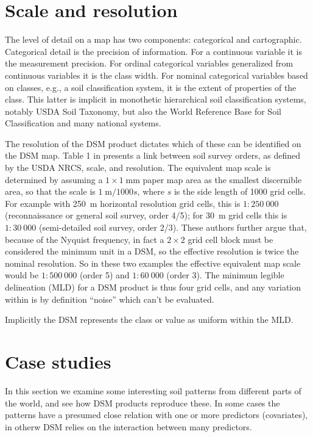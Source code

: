 \documentclass[soil, manuscript]{copernicus}
\begin{document}
\section{Scale and resolution}

\par
The level of detail on a map has two components: categorical and cartographic.
%
Categorical detail is the precision of information. For a continuous variable it is the measurement precision.
%
For ordinal categorical variables generalized from continuous variables it is the class width.
%
For nominal categorical variables based on classes, e.g., a soil classification system, it is the extent of properties of the class.
%
This latter is implicit in monothetic hierarchical soil classification systems, notably USDA Soil Taxonomy, but also the World Reference Base for Soil Classification and many national systems.

\par
The resolution of the DSM product dictates which of these can be identified on the DSM map.
%
Table 1 in \citep{mcbratneyDigitalSoilMapping2003} presents a link between soil survey orders, as defined by the USDA NRCS, scale, and resolution.
%
The equivalent map scale is determined by assuming a  $1 \times 1 \; \mathrm{mm}$ paper map area as the smallest discernible area, so that the scale is $1 \; \mathrm{m}/1000 s$, where $s$ is the side length of 1000 grid cells.
%
For example with 250~m horizontal resolution grid cells, this is $1:250~000$ (reconnaissance or general soil survey, order 4/5); for 30~m  grid cells this is $1:30~000$ (semi-detailed soil survey, order 2/3).
%
These authors further argue that, because of the Nyquist frequency, in fact a $2 \times 2$ grid cell block must be considered the minimum unit in a DSM, so the effective resolution is twice the nominal resolution.
%
So in these two examples the effective equivalent map scale would be $1:500~000$ (order 5) and $1:60~000$ (order 3).
%
The minimum legible delineation (MLD) for a DSM product is thus four grid cells, and any variation within is by definition ``noise'' which can't be evaluated.

\par
Implicitly the DSM represents the class or value as uniform within the MLD.

\section{Case studies}

In this section we examine some interesting soil patterns from different parts of the world, and see how DSM products reproduce these.
%
In some cases the patterns have a presumed close relation with one or more predictors (covariates), in otherw DSM relies on the interaction between many predictors.
\end{document}
